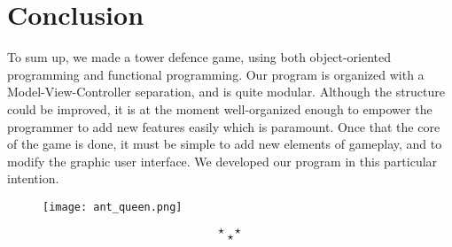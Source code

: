 \documentclass[
	a4paper
]{article}
\newcommand{\theEnd}{\[\star ~ ~ ~ \star\]\[\star\]}
\begin{document}
\section*{Conclusion} %

To sum up, we made a tower defence game, using both object-oriented programming and functional programming. %
Our program is organized with a Model-View-Controller separation, and is quite modular. %
Although the structure could be improved, it is at the moment well-organized enough to empower the programmer to add new features easily which is paramount. %
Once that the core of the game is done, it must be simple to add new elements of gameplay, and to modify the graphic user interface. %
We developed our program in this particular intention.


%
\begin{figure}[H]
	\texttt{[image: ant\_queen.png]}
\end{figure}
%

\theEnd
\end{document}
